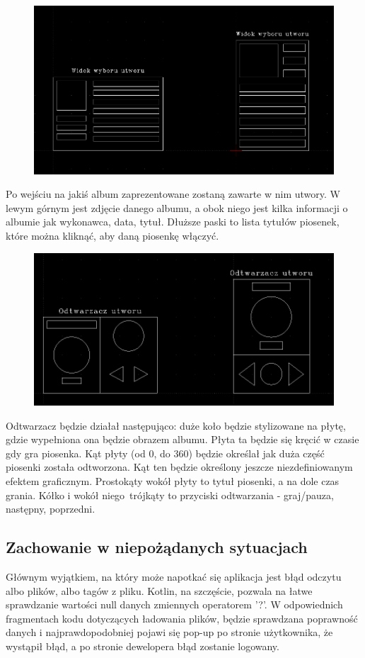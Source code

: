 \begin{figure}[H]
	\centering
	\includegraphics[width=1\textwidth]{images/mockup_utwory.png}
	\caption{}
\end{figure}

Po wejściu na jakiś album zaprezentowane zostaną zawarte w nim utwory. W lewym górnym jest zdjęcie danego albumu, a obok niego jest kilka informacji o albumie jak wykonawca, data, tytuł. Dłuższe paski to lista tytułów piosenek, które można kliknąć, aby daną piosenkę włączyć.

\begin{figure}[H]
	\centering
	\includegraphics[width=1\textwidth]{images/mockup_odtwarzacz.png}
	\caption{}
\end{figure}

Odtwarzacz będzie działał następująco: duże koło będzie stylizowane na płytę, gdzie wypełniona ona będzie obrazem albumu. Płyta ta będzie się kręcić w czasie gdy gra piosenka. Kąt płyty (od 0\degree, do 360\degree) będzie określał jak duża część piosenki została odtworzona. Kąt ten będzie określony jeszcze niezdefiniowanym efektem graficznym. Prostokąty wokół płyty to tytuł piosenki, a na dole czas grania. Kółko i wokół niego trójkąty to przyciski odtwarzania - graj/pauza, następny, poprzedni. 
\subsection{Zachowanie w niepożądanych sytuacjach}
Głównym wyjątkiem, na który może napotkać się aplikacja jest błąd odczytu albo plików, albo tagów z pliku. Kotlin, na szczęście, pozwala na łatwe sprawdzanie wartości null danych zmiennych operatorem '?'. W odpowiednich fragmentach kodu dotyczących ładowania plików, będzie sprawdzana poprawność danych i najprawdopodobniej pojawi się pop-up po stronie użytkownika, że wystąpił błąd, a po stronie dewelopera błąd zostanie logowany.
